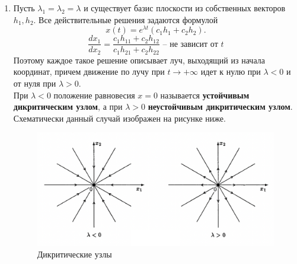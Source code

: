\begin{enumerate}
\begin{enumerate}
    \item Пусть \(\lambda_1 = \lambda_2 = \lambda\) и существует базис плоскости из собственных векторов $h_1, h_2$.
        Все действительные решения задаются формулой
        \[x(t) = e^{\lambda t} ( c_1 h_1 + c_2 h_2).\]
        \[\frac{dx_1}{dx_2}=\frac{c_1h_{11} + c_2h_{12}}{c_1h_{21} + c_2h_{22}} \text{ -- не зависит от } t\]
        Поэтому каждое такое решение описывает луч, выходящий из начала координат, причем движение по лучу при \(t \longrightarrow +\infty\) идет к нулю при \(\lambda < 0\) и от нуля при \(\lambda > 0\).\\
        При \(\lambda < 0\) положение равновесия $x = 0$ называется \textbf{устойчивым дикритическим узлом}, а при \(\lambda > 0\) \textbf{неустойчивым дикритическим узлом}. Схематически данный случай изображен на рисунке ниже.
        \begin{figure}[H]\label{autonom-cased}
            \centering
            \includegraphics[scale=0.8]{sections/Sasha/images/autonom-cased.png}
            \caption{Дикритические узлы}
        \end{figure}


\end{enumerate}
\end{enumerate}
